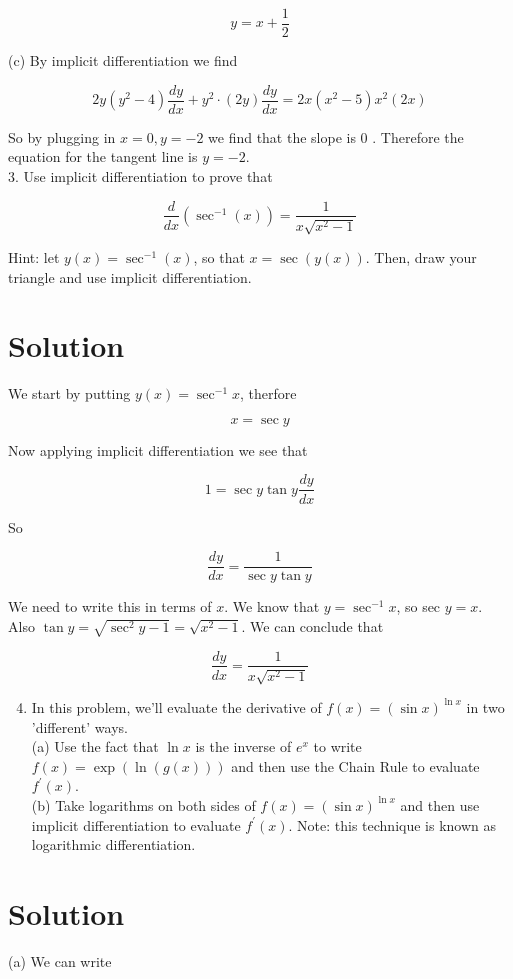 \documentclass[10pt]{article}
\begin{document}
$$
y=x+\frac{1}{2}
$$

(c) By implicit differentiation we find

$$
2 y\left(y^{2}-4\right) \frac{d y}{d x}+y^{2} \cdot(2 y) \frac{d y}{d x}=2 x\left(x^{2}-5\right) x^{2}(2 x)
$$

So by plugging in $x=0, y=-2$ we find that the slope is 0 . Therefore the equation for the tangent line is $y=-2$.\\
3. Use implicit differentiation to prove that

$$
\frac{d}{d x}\left(\sec ^{-1}(x)\right)=\frac{1}{x \sqrt{x^{2}-1}}
$$

Hint: let $y(x)=\sec ^{-1}(x)$, so that $x=\sec (y(x))$. Then, draw your triangle and use implicit differentiation.

\section*{Solution}
We start by putting $y(x)=\sec ^{-1} x$, therfore

$$
x=\sec y
$$

Now applying implicit differentiation we see that

$$
1=\sec y \tan y \frac{d y}{d x}
$$

So

$$
\frac{d y}{d x}=\frac{1}{\sec y \tan y}
$$

We need to write this in terms of $x$. We know that $y=\sec ^{-1} x$, so sec $y=x$. Also $\tan y=\sqrt{\sec ^{2} y-1}=\sqrt{x^{2}-1}$. We can conclude that

$$
\frac{d y}{d x}=\frac{1}{x \sqrt{x^{2}-1}}
$$

\begin{enumerate}
  \setcounter{enumi}{3}
  \item In this problem, we'll evaluate the derivative of $f(x)=(\sin x)^{\ln x}$ in two 'different' ways.\\
(a) Use the fact that $\ln x$ is the inverse of $e^{x}$ to write $f(x)=\exp (\ln (g(x)))$ and then use the Chain Rule to evaluate $f^{\prime}(x)$.\\
(b) Take logarithms on both sides of $f(x)=(\sin x)^{\ln x}$ and then use implicit differentiation to evaluate $f^{\prime}(x)$. Note: this technique is known as logarithmic differentiation.
\end{enumerate}

\section*{Solution}
(a) We can write
\end{document}
